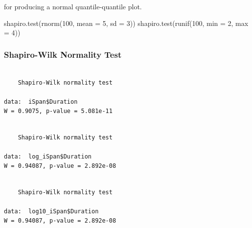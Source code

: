 \documentclass[
  letterpaper,
  DIV=11,
  numbers=noendperiod]{scrartcl}
\newenvironment{Shaded}{\begin{snugshade}}{\end{snugshade}}
\newcommand{\FunctionTok}[1]{\textcolor[rgb]{0.28,0.35,0.67}{#1}}
\newcommand{\NormalTok}[1]{\textcolor[rgb]{0.00,0.23,0.31}{#1}}
\newcommand{\SpecialCharTok}[1]{\textcolor[rgb]{0.37,0.37,0.37}{#1}}
\begin{document}
%
\begin{SeeAlso}\relax
{} for producing a normal quantile-quantile plot.
\end{SeeAlso}
%
\begin{Examples}
\begin{ExampleCode}
shapiro.test(rnorm(100, mean = 5, sd = 3))
shapiro.test(runif(100, min = 2, max = 4))
\end{ExampleCode}
\end{Examples}

\hypertarget{shapiro-wilk-normality-test}{%
\subsubsection{Shapiro-Wilk Normality
Test}\label{shapiro-wilk-normality-test}}

\begin{Shaded}
\end{Shaded}

\begin{verbatim}

    Shapiro-Wilk normality test

data:  iSpan$Duration
W = 0.9075, p-value = 5.081e-11
\end{verbatim}

\begin{verbatim}

    Shapiro-Wilk normality test

data:  log_iSpan$Duration
W = 0.94087, p-value = 2.892e-08
\end{verbatim}

\begin{verbatim}

    Shapiro-Wilk normality test

data:  log10_iSpan$Duration
W = 0.94087, p-value = 2.892e-08
\end{verbatim}
\end{document}
